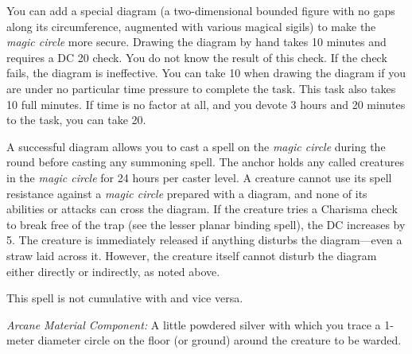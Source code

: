 {	You can add a special diagram (a two-dimensional bounded figure with no gaps along its circumference, augmented with various magical sigils) to make the \emph{magic circle} more secure. Drawing the diagram by hand takes 10 minutes and requires a DC 20  check. You do not know the result of this check. If the check fails, the diagram is ineffective. You can take 10 when drawing the diagram if you are under no particular time pressure to complete the task. This task also takes 10 full minutes. If time is no factor at all, and you devote 3 hours and 20 minutes to the task, you can take 20.

	A successful diagram allows you to cast a  spell on the \emph{magic circle} during the round before casting any summoning spell. The anchor holds any called creatures in the \emph{magic circle} for 24 hours per caster level. A creature cannot use its spell resistance against a \emph{magic circle} prepared with a diagram, and none of its abilities or attacks can cross the diagram. If the creature tries a Charisma check to break free of the trap (see the lesser planar binding spell), the DC increases by 5. The creature is immediately released if anything disturbs the diagram---even a straw laid across it. However, the creature itself cannot disturb the diagram either directly or indirectly, as noted above.

	This spell is not cumulative with  and vice versa.

	\textit{Arcane Material Component:}
	A little powdered silver with which you trace a 1-meter diameter circle on the floor (or ground) around the creature to be warded.

}
